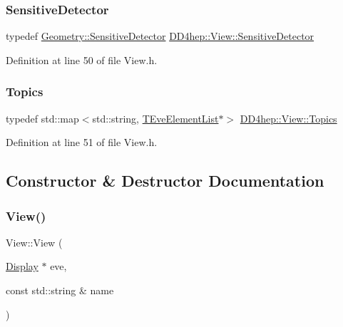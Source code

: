 \subsubsection{\texorpdfstring{Sensitive\+Detector}{SensitiveDetector}}
{\footnotesize\ttfamily typedef \hyperlink{class_d_d4hep_1_1_geometry_1_1_sensitive_detector}{Geometry\+::\+Sensitive\+Detector} \hyperlink{class_d_d4hep_1_1_view_ad8426310f6488c879c008001eb20289e}{D\+D4hep\+::\+View\+::\+Sensitive\+Detector}}



Definition at line 50 of file View.\+h.

\hypertarget{class_d_d4hep_1_1_view_aac8510a8567e5e9128020fd81d8f57de}{}\label{class_d_d4hep_1_1_view_aac8510a8567e5e9128020fd81d8f57de} 
\subsubsection{\texorpdfstring{Topics}{Topics}}
{\footnotesize\ttfamily typedef std\+::map$<$std\+::string, \hyperlink{class_t_eve_element_list}{T\+Eve\+Element\+List}$\ast$$>$ \hyperlink{class_d_d4hep_1_1_view_aac8510a8567e5e9128020fd81d8f57de}{D\+D4hep\+::\+View\+::\+Topics}}



Definition at line 51 of file View.\+h.



\subsection{Constructor \& Destructor Documentation}
\hypertarget{class_d_d4hep_1_1_view_a69c5b7344436a9b030d9a64ead608de8}{}\label{class_d_d4hep_1_1_view_a69c5b7344436a9b030d9a64ead608de8} 
\subsubsection{\texorpdfstring{View()}{View()}}
{\footnotesize\ttfamily View\+::\+View (\begin{DoxyParamCaption}\item[{\hyperlink{class_d_d4hep_1_1_display}{Display} $\ast$}]{eve,  }\item[{const std\+::string \&}]{name }\end{DoxyParamCaption})}



